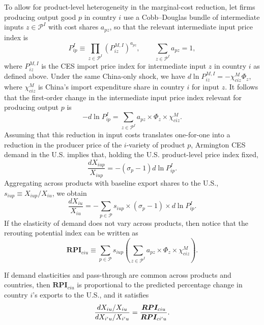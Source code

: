 \documentclass[english,12pt]{article}
\theoremstyle{definition}
\begin{document}
To allow for product-level heterogeneity in the marginal-cost reduction, let
firms producing output good $p$ in country $i$ use a Cobb--Douglas bundle of
intermediate inputs $z\in \mathcal{P}^{I}$ with cost shares $a_{pz}$, so
that the relevant intermediate input price index is 
\begin{equation*}
P_{ip}^{I}\equiv \prod_{z\in \mathcal{P}^{I}}\left( P_{iz}^{M,I}\right)
^{a_{pz}},\qquad \sum_{z\in \mathcal{P}^{I}}a_{pz}=1,
\end{equation*}%
where $P_{iz}^{M,I}$ is the CES import price index for intermediate input $z$
in country $i$ as defined above. Under the same China-only shock, we have $%
d\ln P_{iz}^{M,I}=-\chi _{ciz}^{M}\Phi _{z}$, where $\chi _{ciz}^{M}$ is
China's import expenditure share in country $i$ for input $z$. It follows
that the first-order change in the intermediate input price index relevant
for producing output $p$ is 
\begin{equation*}
-d\ln P_{ip}^{I}=\sum_{z\in \mathcal{P}^{I}}a_{pz}\times \Phi _{z}\times
\chi _{ciz}^{M}.
\end{equation*}%
Assuming that this reduction in input costs translates one-for-one into a
reduction in the producer price of the $i$-variety of product $p$, Armington
CES demand in the U.S. implies that, holding the U.S. product-level price
index fixed, 
\begin{equation*}
\frac{dX_{iup}}{X_{iup}}=-(\sigma _{p}-1)d\ln P_{ip}^{I}.
\end{equation*}%
Aggregating across products with baseline export shares to the U.S., $%
s_{iup}\equiv X_{iup}/X_{iu}$, we obtain 
\begin{equation*}
\frac{dX_{iu}}{X_{iu}}=-\sum_{p\in \mathcal{P}}s_{iup}\times (\sigma
_{p}-1)\times d\ln P_{ip}^{I}.
\end{equation*}%
If the elasticity of demand does not vary across products, then notice that
the rerouting potential index can be written as 
\begin{equation}
\boldsymbol{RPI}_{ciu}\equiv \sum_{p\in \mathcal{P}}s_{iup}\left( \sum_{z\in 
\mathcal{P}^{I}}a_{pz}\times \Phi _{z}\times \chi _{ciz}^{M}\right) .
\label{eq: RPI Appendix}
\end{equation}

If demand elasticities and pass-through are common across products and
countries, then $\boldsymbol{RPI}_{ciu}$ is proportional to the predicted
percentage change in country $i$'s exports to the U.S., and it satisfies 
\begin{equation*}
\frac{dX_{iu}/X_{iu}}{dX_{i^{\prime }u}/X_{i^{\prime }u}}=\frac{\boldsymbol{%
RPI}_{ciu}}{\boldsymbol{RPI}_{ci^{\prime }u}}\text{.}
\end{equation*}
\end{document}
